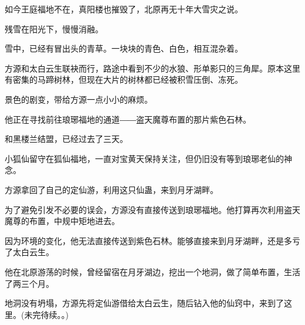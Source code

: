 \begin{this_body}
如今王庭福地不在，真阳楼也摧毁了，北原再无十年大雪灾之说。

残雪在阳光下，慢慢消融。

雪中，已经有冒出头的青草。一块块的青色、白色，相互混杂着。

方源和太白云生联袂而行，路途中看到不少的水狼、形单影只的三角犀。原本这里有密集的马蹄树林，但现在大片的树林都已经被积雪压倒、冻死。

景色的剧变，带给方源一点小小的麻烦。

他正在寻找前往琅琊福地的通道――盗天魔尊布置的那片紫色石林。

和黑楼兰结盟，已经过去了三天。

小狐仙留守在狐仙福地，一直对宝黄天保持关注，但仍旧没有等到琅琊老仙的神念。

方源拿回了自己的定仙游，利用这只仙蛊，来到月牙湖畔。

为了避免引发不必要的误会，方源没有直接传送到琅琊福地。他打算再次利用盗天魔尊的布置，中规中矩地进去。

因为环境的变化，他无法直接传送到紫色石林。能够直接来到月牙湖畔，还是多亏了太白云生。

他在北原游荡的时候，曾经留宿在月牙湖边，挖出一个地洞，做了简单布置，生活了两三个月。

地洞没有坍塌，方源先将定仙游借给太白云生，随后钻入他的仙窍中，来到了这里。(未完待续。。)

\end{this_body}

